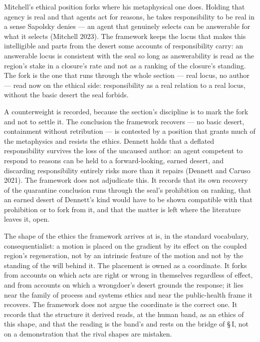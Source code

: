 \documentclass[11pt,oneside]{report}
\theoremstyle{definition}
\theoremstyle{remark}
\begin{document}
Mitchell's ethical position forks where his metaphysical one does. Holding that agency is real and that agents act for reasons, he takes responsibility to be real in a sense Sapolsky denies --- an agent that genuinely selects can be answerable for what it selects (Mitchell 2023). The framework keeps the locus that makes this intelligible and parts from the desert some accounts of responsibility carry: an answerable locus is consistent with the seal so long as answerability is read as the region's stake in a closure's rate and not as a ranking of the closure's standing. The fork is the one that runs through the whole section --- real locus, no author --- read now on the ethical side: responsibility as a real relation to a real locus, without the basic desert the seal forbids.

A counterweight is recorded, because the section's discipline is to mark the fork and not to settle it. The conclusion the framework recovers --- no basic desert, containment without retribution --- is contested by a position that grants much of the metaphysics and resists the ethics. Dennett holds that a deflated responsibility survives the loss of the uncaused author: an agent competent to respond to reasons can be held to a forward-looking, earned desert, and discarding responsibility entirely risks more than it repairs (Dennett and Caruso 2021). The framework does not adjudicate this. It records that its own recovery of the quarantine conclusion runs through the seal's prohibition on ranking, that an earned desert of Dennett's kind would have to be shown compatible with that prohibition or to fork from it, and that the matter is left where the literature leaves it, open.

The shape of the ethics the framework arrives at is, in the standard vocabulary, consequentialist: a motion is placed on the gradient by its effect on the coupled region's regeneration, not by an intrinsic feature of the motion and not by the standing of the will behind it. The placement is owned as a coordinate. It forks from accounts on which acts are right or wrong in themselves regardless of effect, and from accounts on which a wrongdoer's desert grounds the response; it lies near the family of process and systems ethics and near the public-health frame it recovers. The framework does not argue the coordinate is the correct one. It records that the structure it derived reads, at the human band, as an ethics of this shape, and that the reading is the band's and rests on the bridge of \S\,I, not on a demonstration that the rival shapes are mistaken.
\end{document}
